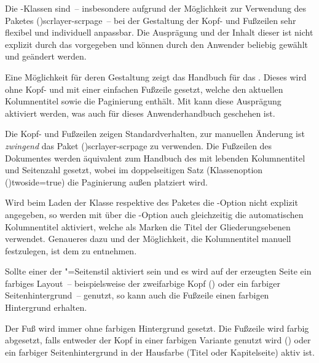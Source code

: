 \begin{DeclareEntity*}{}
\begin{DeclareEntity*}{}
\begin{DeclareEntity*}{}
\begin{Declaration}
Die \TUDScript-Klassen sind~-- insbesondere aufgrund der Möglichkeit zur 
Verwendung des Paketes \Package(){scrlayer-scrpage}~-- bei 
der Gestaltung der Kopf- und Fußzeilen sehr flexibel und individuell anpassbar. 
Die Ausprägung und der Inhalt dieser ist nicht explizit durch das \CD 
vorgegeben und können durch den Anwender beliebig gewählt und geändert werden. 

Eine Möglichkeit für deren Gestaltung zeigt das Handbuch für das \TUDCD. Dieses 
wird ohne Kopf- und mit einer einfachen Fußzeile gesetzt, welche den aktuellen 
Kolumnentitel sowie die Paginierung enthält. Mit  kann diese 
Ausprägung aktiviert werden, was auch für dieses Anwenderhandbuch geschehen ist.
%
\begin{DeclareValues}{}
  Die Kopf- und Fußzeilen zeigen Standardverhalten, zur manuellen Änderung 
  ist \emph{zwingend} das Paket \Package(){scrlayer-scrpage}
  zu verwenden.
  Die Fußzeilen des Dokumentes werden äquivalent zum Handbuch des \TUDCDs mit 
  lebenden Kolumnentitel und Seitenzahl gesetzt, wobei im doppelseitigen Satz 
  (Klassenoption \Option(){twoside=true}) die 
  Paginierung außen platziert wird.
\end{DeclareValues}

%
Wird beim Laden der Klasse respektive des Paketes  
die \KOMAScript-Option 
nicht explizit angegeben, so werden mit  über die 
\KOMAScript-Option 
auch gleichzeitig die automatischen Kolumnentitel aktiviert, welche als Marken 
die Titel der Gliederungsebenen verwendet. Genaueres dazu und der Möglichkeit, 
die Kolumnentitel manuell festzulegen, ist dem \scrguide zu entnehmen.

%
Sollte einer der "=Seitenstil aktiviert sein und es wird 
auf der erzeugten Seite ein farbiges Layout~-- beispielsweise der zweifarbige 
Kopf () oder ein farbiger Seitenhintergrund~-- genutzt, 
so kann auch die Fußzeile einen farbigen Hintergrund erhalten.
%
\begin{DeclareValues}{}
  Der Fuß wird immer ohne farbigen Hintergrund gesetzt.
  Die Fußzeile wird farbig abgesetzt, falls entweder der Kopf in einer farbigen
  Variante genutzt wird () oder ein farbiger 
  Seitenhintergrund in der Hausfarbe (Titel oder Kapitelseite) aktiv ist.
\end{DeclareValues}


\end{Declaration}
\end{DeclareEntity*}
\end{DeclareEntity*}
\end{DeclareEntity*}
